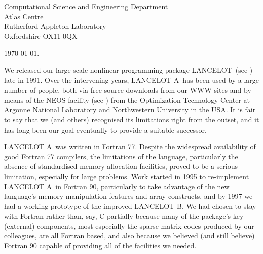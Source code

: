 \documentclass[twoside]{article}
\newcommand{\gal}{{\sf GALAHAD}}
\newcommand{\lan}{{\sf LANCELOT}}
\newcommand{\lana}{{\sf LANCELOT A}}
\newcommand{\lanb}{{\sf LANCELOT B}}
\begin{document}
\begin{titlepage}
\vspace{0.6 cm}

\noindent 
Computational Science and Engineering Department
\\
Atlas Centre
\\
Rutherford Appleton Laboratory
\\
Oxfordshire OX11 0QX

\vspace{0.1 cm}
\noindent \today .



\end{titlepage}




\setcounter{page}{1}

We released our large-scale nonlinear programming package \lan\
(see ) late in 1991. Over the intervening
years, \lana\ has been used by a large number of people, both
via free source downloads from our WWW sites
and by means of the NEOS facility (see )
from the Optimization Technology Center at
Argonne National Laboratory and Northwestern University in the USA.
It is fair to say that we (and others) recognised its limitations
right from the outset, and it has long been our goal eventually to provide 
a suitable successor.

\lana\ was written in Fortran 77. 
Despite the widespread availability of good 
Fortran 77 compilers, the limitations of the language, particularly
the absence of standardised memory allocation facilities, proved to be
a serious limitation, especially for large problems. 
Work started in 1995 to re-implement \lana\ in
Fortran 90, particularly to take advantage of the new language's 
memory manipulation features and array constructs, and by 1997 we had a 
working prototype of the improved \lanb. We had chosen to stay with
Fortran rather than, say, C partially because many of the package's 
key (external) components, most especially the \citebb{hsl:2002}
sparse matrix codes
produced by our colleagues, are all Fortran based, and also because
we believed (and still believe) Fortran 90 capable of providing
all of the facilities we needed.
\end{document}
